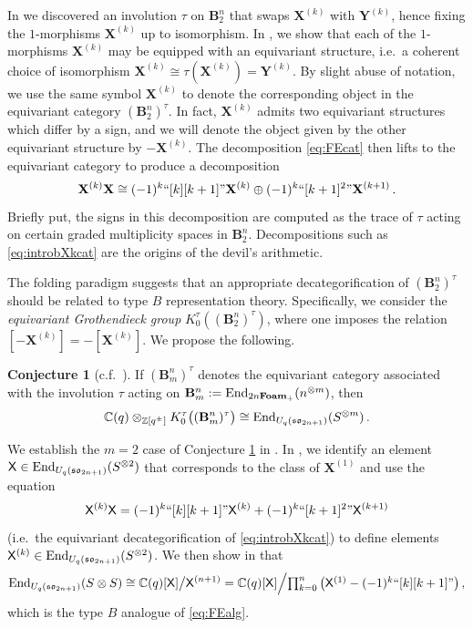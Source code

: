 \documentclass[10pt]{amsart}
\numberwithin{equation}{section}
\theoremstyle{definition}
\newtheorem{conj}[thm]{Conjecture}
\newcommand{\End}{{\rm End}}
\def\C{{\mathbb C}}
\def\Z{{\mathbb Z}}
\newcommand{\son}[1][2n+1]{\mathfrak{so}_{#1}}
\newcommand{\FEk}{\mathbf{X}^{(k)}}
\newcommand{\FE}{\mathbf{X}}
\newcommand{\FEalt}{\mathbf{Y}}%
\begin{document}
In \cite{BER} we discovered an involution $\tau$ on $\mathbf{B}_2^n$ 
that swaps $\FEk$ with $\FEalt^{(k)}$, hence fixing the $1$-morphisms $\FEk$ up to isomorphism. 
In \cite[Proposition 8.6]{BER}, we show that each of the 
$1$-morphisms $\FEk$ may be equipped with an equivariant structure, 
i.e.~a coherent choice of isomorphism $\FEk \cong \tau(\FEk)=\FEalt^{(k)}$. 
By slight abuse of notation, we use the same symbol $\FEk$ 
to denote the corresponding object in the equivariant category $(\mathbf{B}^n_2)^\tau$. 
In fact, $\FEk$ admits two equivariant structures which differ by a sign, 
and we will denote the object given by the other equivariant structure by $-\FEk$. 
The decomposition \eqref{eq:FEcat} then lifts to the equivariant category to produce a decomposition
\begin{equation}\label{eq:introbXkcat}
\FEk \FE 
	\cong (-1)^{k} ``[k][k+1]"\FEk \oplus (-1)^k``[k+1]^2"\FE^{(k+1)} \, .
\end{equation}
Briefly put, the signs in this decomposition are computed as the trace of $\tau$ 
acting on certain graded multiplicity spaces in $\mathbf{B}_2^n$.
Decompositions such as \eqref{eq:introbXkcat} are the origins of the devil's arithmetic.

The folding paradigm suggests that an appropriate decategorification of $(\mathbf{B}^n_2)^\tau$ 
should be related to type $B$ representation theory.
Specifically, we consider the \emph{equivariant Grothendieck group} 
$K_0^\tau((\mathbf{B}^n_2)^\tau)$, where one imposes the relation $[-\FEk] = -[\FEk]$. We propose the following.
\begin{conj}[{c.f.~\cite[Conjecture 1.10]{BER}}]
	\label{conj:SLH}
If $(\mathbf{B}^n_m)^\tau$ denotes the equivariant category 
associated with the involution $\tau$ acting on 
$\mathbf{B}^n_m := \End_{2n\mathbf{Foam_+}}(n^{\otimes m})$,
then
\[
\C(q) \otimes_{\Z[q^{\pm}]} K_0^{\tau}\big((\mathbf{B}^n_m)^\tau \big)
	\cong \End_{U_q(\son)}(S^{\otimes m}) \, .
	\]
\end{conj}

We establish the $m=2$ case of Conjecture \ref{conj:SLH} in \cite[Theorem 1.9]{BER}. 
In \cite[Definition 4.24]{BER}, 
we identify an element $\mathsf{X} \in \End_{U_q(\son)}(S^{\otimes 2})$ 
that corresponds to the class of $\FE^{(1)}$ and use the equation 
\begin{equation}\label{eq:introbXk}
\mathsf{X}^{(k)} \mathsf{X}  
	= (-1)^{k} ``[k][k+1]"\mathsf{X}^{(k)} + (-1)^k``[k+1]^2"\mathsf{X}^{(k+1)}
\end{equation}
(i.e.~the equivariant decategorification of \eqref{eq:introbXkcat})
to define elements $\mathsf{X}^{(k)} \in \End_{U_q(\son)}(S^{\otimes 2})$. 
We then show in \cite[Proposition 4.25 and Remark 4.26]{BER} that
\begin{equation}\label{eq:devilsalg}
\End_{U_q(\son)}(S \otimes S) \cong 
\C(q)[\mathsf{X}] {\big /} \mathsf{X}^{(n+1)} = 
\C(q)[\mathsf{X}] {\Big /} 
	{\textstyle \prod_{k=0}^n \big(\mathsf{X}^{(1)} - (-1)^k ``[k][k+1]" \big)} \, , 
\end{equation}
which is the type $B$ analogue of \eqref{eq:FEalg}.
\end{document}
